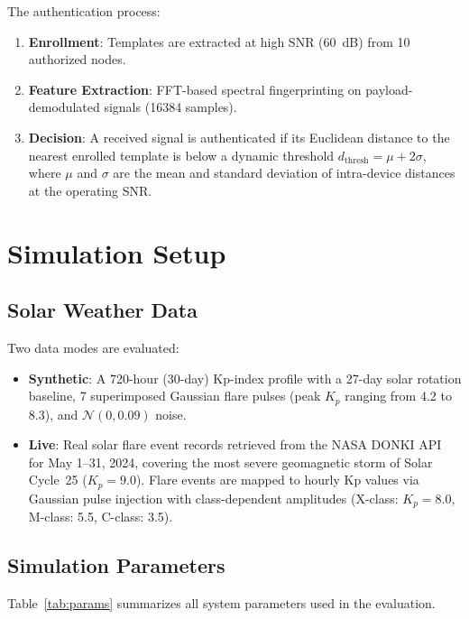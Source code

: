 \documentclass[journal]{IEEEtran}
\begin{document}
The authentication process:
\begin{enumerate}
    \item \textbf{Enrollment}: Templates are extracted at high SNR (60~dB) from 10 authorized nodes.
    \item \textbf{Feature Extraction}: FFT-based spectral fingerprinting on payload-demodulated signals (16384 samples).
    \item \textbf{Decision}: A received signal is authenticated if its Euclidean distance to the nearest enrolled template is below a dynamic threshold $d_{\text{thresh}} = \mu + 2\sigma$, where $\mu$ and $\sigma$ are the mean and standard deviation of intra-device distances at the operating SNR.
\end{enumerate}



\section{Simulation Setup}

\subsection{Solar Weather Data}
Two data modes are evaluated:
\begin{itemize}
    \item \textbf{Synthetic}: A 720-hour (30-day) Kp-index profile with a 27-day solar rotation baseline, 7 superimposed Gaussian flare pulses (peak $K_p$ ranging from 4.2 to 8.3), and $\mathcal{N}(0, 0.09)$ noise.
    \item \textbf{Live}: Real solar flare event records retrieved from the NASA DONKI API~\cite{nasa2024donki} for May 1--31, 2024, covering the most severe geomagnetic storm of Solar Cycle~25 ($K_p = 9.0$). Flare events are mapped to hourly Kp values via Gaussian pulse injection with class-dependent amplitudes (X-class: $K_p = 8.0$, M-class: 5.5, C-class: 3.5).
\end{itemize}

\subsection{Simulation Parameters}
Table~\ref{tab:params} summarizes all system parameters used in the evaluation.
\end{document}
